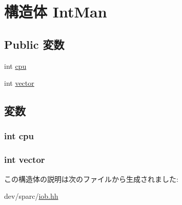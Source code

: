 \hypertarget{structIob_1_1IntMan}{
\section{構造体 IntMan}
\label{structIob_1_1IntMan}
}
\subsection*{Public 変数}
\begin{DoxyCompactItemize}
\item 
int \hyperlink{structIob_1_1IntMan_a41a58b7c4446ab1abce89f43531cd523}{cpu}
\item 
int \hyperlink{structIob_1_1IntMan_ad5fc8b76855f6311d42af415675f4a4e}{vector}
\end{DoxyCompactItemize}


\subsection{変数}
\hypertarget{structIob_1_1IntMan_a41a58b7c4446ab1abce89f43531cd523}{
\subsubsection[{cpu}]{\setlength{\rightskip}{0pt plus 5cm}int {\bf cpu}}}
\label{structIob_1_1IntMan_a41a58b7c4446ab1abce89f43531cd523}
\hypertarget{structIob_1_1IntMan_ad5fc8b76855f6311d42af415675f4a4e}{
\subsubsection[{vector}]{\setlength{\rightskip}{0pt plus 5cm}int {\bf vector}}}
\label{structIob_1_1IntMan_ad5fc8b76855f6311d42af415675f4a4e}


この構造体の説明は次のファイルから生成されました:\begin{DoxyCompactItemize}
\item 
dev/sparc/\hyperlink{iob_8hh}{iob.hh}\end{DoxyCompactItemize}
